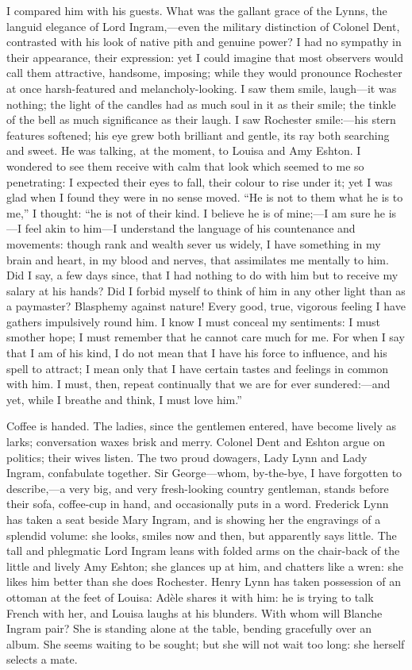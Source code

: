I compared him with his guests. What was the gallant grace of the
Lynns, the languid elegance of Lord Ingram,---even the military
distinction of Colonel Dent, contrasted with his look of native pith and
genuine power? I had no sympathy in their appearance, their expression:
yet I could imagine that most observers would call them attractive,
handsome, imposing; while they would pronounce \Mr{} Rochester at once
harsh-featured and melancholy-looking. I saw them smile, laugh---it was
nothing; the light of the candles had as much soul in it as their smile;
the tinkle of the bell as much significance as their laugh. I saw \Mr{}
 Rochester smile:---his stern features softened; his eye grew both
brilliant and gentle, its ray both searching and sweet. He was talking,
at the moment, to Louisa and Amy Eshton. I wondered to see them receive
with calm that look which seemed to me so penetrating: I expected their
eyes to fall, their colour to rise under it; yet I was glad when I found
they were in no sense moved. \enquote{He is not to them what he is to
me,} I thought: \enquote{he is not of their kind. I believe he is of
mine;---I am sure he is---I feel akin to him---I understand the language
of his countenance and movements: though rank and wealth sever us
widely, I have something in my brain and heart, in my blood and nerves,
that assimilates me mentally to him. Did I say, a few days since, that
I had nothing to do with him but to receive my salary at his hands? Did
I forbid myself to think of him in any other light than as a paymaster? 
Blasphemy against nature! Every good, true, vigorous feeling I have
gathers impulsively round him. I know I must conceal my sentiments: I
must smother hope; I must remember that he cannot care much for me. For
when I say that I am of his kind, I do not mean that I have his force to
influence, and his spell to attract; I mean only that I have certain
tastes and feelings in common with him. I must, then, repeat
continually that we are for ever sundered:---and yet, while I breathe
and think, I must love him.}

Coffee is handed. The ladies, since the gentlemen entered, have become
lively as larks; conversation waxes brisk and merry. Colonel Dent and
\Mr{} Eshton argue on politics; their wives listen. The two proud
dowagers, Lady Lynn and Lady Ingram, confabulate together. Sir
George---whom, by-the-bye, I have forgotten to describe,---a very big,
and very fresh-looking country gentleman, stands before their sofa,
coffee-cup in hand, and occasionally puts in a word. \Mr{} Frederick Lynn
has taken a seat beside Mary Ingram, and is showing her the engravings
of a splendid volume: she looks, smiles now and then, but apparently
says little. The tall and phlegmatic Lord Ingram leans with folded arms
on the chair-back of the little and lively Amy Eshton; she glances up at
him, and chatters like a wren: she likes him better than she does \Mr{}
 Rochester. Henry Lynn has taken possession of an ottoman at the feet of
Louisa: Adèle shares it with him: he is trying to talk French with her,
and Louisa laughs at his blunders. With whom will Blanche Ingram pair? 
She is standing alone at the table, bending gracefully over an album. 
She seems waiting to be sought; but she will not wait too long: she
herself selects a mate.

